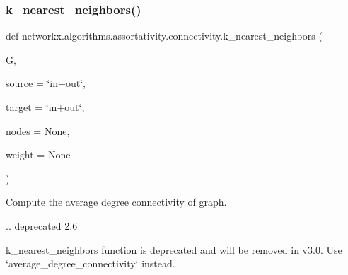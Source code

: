 \subsubsection{\texorpdfstring{k\+\_\+nearest\+\_\+neighbors()}{k\_nearest\_neighbors()}}
{\footnotesize\ttfamily def networkx.\+algorithms.\+assortativity.\+connectivity.\+k\+\_\+nearest\+\_\+neighbors (\begin{DoxyParamCaption}\item[{}]{G,  }\item[{}]{source = {\ttfamily \char`\"{}in+out\char`\"{}},  }\item[{}]{target = {\ttfamily \char`\"{}in+out\char`\"{}},  }\item[{}]{nodes = {\ttfamily None},  }\item[{}]{weight = {\ttfamily None} }\end{DoxyParamCaption})}

\begin{DoxyVerb}Compute the average degree connectivity of graph.

.. deprecated 2.6

  k_nearest_neighbors function is deprecated and will be removed in v3.0.
  Use `average_degree_connectivity` instead.
\end{DoxyVerb}
 